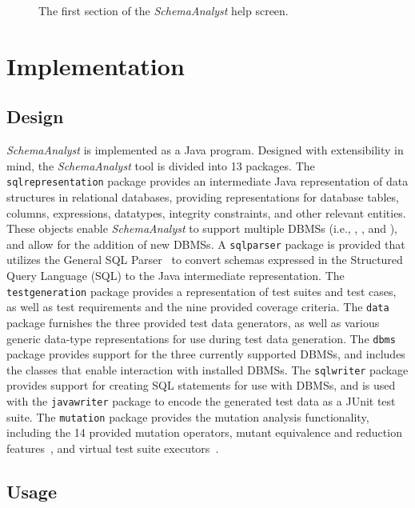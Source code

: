 \begin{figure}

\caption{\label{fig:usage} The first section of the \textit{SchemaAnalyst} help screen.}
\end{figure}

\section{Implementation}\label{sec:implementation}
\subsection{Design}


\textit{SchemaAnalyst} is implemented as a Java program.  Designed with extensibility in mind, the
\textit{SchemaAnalyst} tool is divided into 13 packages. The \texttt{sqlrepresentation} package provides an intermediate
Java representation of data structures in relational databases, providing representations for database tables, columns,
expressions, datatypes, integrity constraints, and other relevant entities. These objects enable \textit{SchemaAnalyst}
to support multiple DBMSs (i.e., \sqlite, \postgres, and \hypersql), and allow for the addition of new DBMSs. A
\texttt{sqlparser} package is provided that utilizes the General SQL Parser~\cite{} to convert schemas expressed in the
Structured Query Language (SQL) to the Java intermediate representation. The \texttt{testgeneration} package provides a
representation of test suites and test cases, as well as test requirements and the nine provided coverage criteria. The
\texttt{data} package furnishes the three provided test data generators, as well as various generic data-type
representations for use during test data generation. The \texttt{dbms} package provides support for the three currently
supported DBMSs, and includes the classes that enable interaction with installed DBMSs. The \texttt{sqlwriter} package
provides support for creating SQL statements for use with DBMSs, and is used with the \texttt{javawriter} package to
encode the generated test data as a JUnit test suite. The \texttt{mutation} package provides the mutation analysis
functionality, including the 14 provided mutation operators, mutant equivalence and reduction
features~\cite{wright2014impact}, and virtual test suite executors~\cite{mcminn2016virtual}.

\subsection{Usage}

